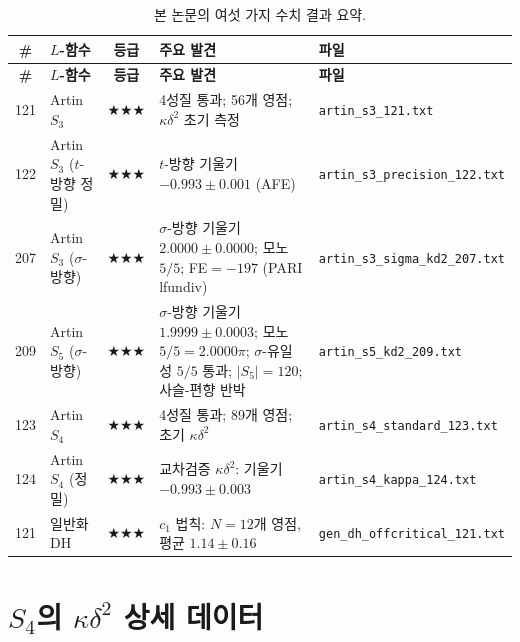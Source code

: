 \documentclass[11pt, a4paper]{article}
\theoremstyle{plain}
\theoremstyle{definition}
\newcommand{\kap}{\kappa}             %
\begin{document}
\begin{longtable}{@{}clcp{5.5cm}l@{}}
\caption{본 논문의 여섯 가지 수치 결과 요약.}
\label{tab:summary} \\
\toprule
\textbf{\#} & \textbf{$L$-함수} & \textbf{등급}
  & \textbf{주요 발견} & \textbf{파일} \\
\midrule
\endfirsthead
\toprule
\textbf{\#} & \textbf{$L$-함수} & \textbf{등급}
  & \textbf{주요 발견} & \textbf{파일} \\
\midrule
\endhead
121 & Artin $S_{3}$ & $\bigstar\!\bigstar\!\bigstar$ &
  4성질 통과; 56개 영점; $\kap\delta^{2}$ 초기 측정 &
  \texttt{artin\_s3\_121.txt} \\
122 & Artin $S_{3}$ ($t$-방향 정밀) & $\bigstar\!\bigstar\!\bigstar$ &
  $t$-방향 기울기 $-0.993\pm0.001$ (AFE) &
  \texttt{artin\_s3\_precision\_122.txt} \\
207 & Artin $S_{3}$ ($\sigma$-방향) & $\bigstar\!\bigstar\!\bigstar$ &
  $\sigma$-방향 기울기 $2.0000\pm0.0000$; 모노 $5/5$;
  FE$=-197$ (PARI lfundiv) &
  \texttt{artin\_s3\_sigma\_kd2\_207.txt} \\
209 & Artin $S_{5}$ ($\sigma$-방향) & $\bigstar\!\bigstar\!\bigstar$ &
  $\sigma$-방향 기울기 $1.9999\pm0.0003$; 모노 $5/5=2.0000\pi$;
  $\sigma$-유일성 $5/5$ 통과; $|S_5|=120$; 사슬-편향 반박 &
  \texttt{artin\_s5\_kd2\_209.txt} \\
123 & Artin $S_{4}$ & $\bigstar\!\bigstar\!\bigstar$ &
  4성질 통과; 89개 영점; 초기 $\kap\delta^{2}$ &
  \texttt{artin\_s4\_standard\_123.txt} \\
124 & Artin $S_{4}$ (정밀) & $\bigstar\!\bigstar\!\bigstar$ &
  교차검증 $\kap\delta^{2}$: 기울기 $-0.993\pm0.003$ &
  \texttt{artin\_s4\_kappa\_124.txt} \\
121 & 일반화 DH & $\bigstar\!\bigstar\!\bigstar$ &
  $c_{1}$ 법칙: $N{=}12$개 영점, 평균 $1.14\pm0.16$ &
  \texttt{gen\_dh\_offcritical\_121.txt} \\
\bottomrule
\end{longtable}


\section{$S_{4}$의 $\kap\delta^{2}$ 상세 데이터}
\label{app:s4-data}
\end{document}
